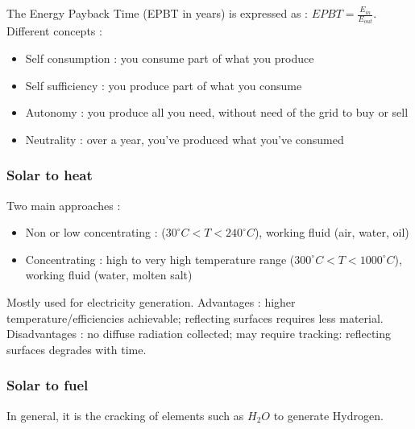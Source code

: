 \documentclass[../main.tex]{subfiles}
\begin{document}
The Energy Payback Time (EPBT in years) is expressed as : $EPBT = \frac{E_{in}}{E_{out}}$.\\

Different concepts : \begin{itemize}
    \item Self consumption : you consume part of what you produce
    \item Self sufficiency : you produce part of what you consume
    \item Autonomy : you produce all you need, without need of the grid to buy or sell
    \item Neutrality : over a year, you've produced what you've consumed
\end{itemize}

\subsubsection{Solar to heat}
Two main approaches : \begin{itemize}
    \item Non or low concentrating : ($30^\circ C < T < 240^\circ C$), working fluid (air, water, oil)
    \item Concentrating : high to very high temperature range ($300^\circ C < T < 1000^\circ C$), working fluid (water, molten salt)
\end{itemize}

Mostly used for electricity generation. Advantages : higher temperature/efficiencies achievable; reflecting surfaces requires less material. Disadvantages : no diffuse radiation collected; may require tracking: reflecting surfaces degrades with time.\\

\subsubsection{Solar to fuel}

In general, it is the cracking of elements such as $H_2O$ to generate Hydrogen.\\
\end{document}
